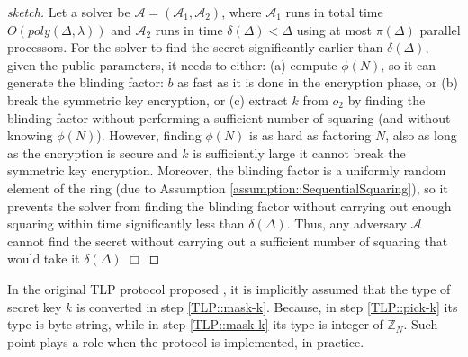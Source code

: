 \begin{proof}[sketch] 
Let  a solver be $\mathcal{A}=(\mathcal{A}_{\scriptscriptstyle 1},\mathcal{A}_{\scriptscriptstyle 2})$, where $\mathcal{A}_{\scriptscriptstyle 1}$ runs in total time $O(poly(\Delta,\lambda))$ and $\mathcal{A}_{\scriptscriptstyle 2}$ runs in  time $\delta(\Delta)<\Delta$ using at most $\pi(\Delta)$ parallel processors. For  the solver to find  the secret significantly earlier than $\delta(\Delta)$, given the public parameters, it needs to either: (a) compute $\phi(N)$, so it can generate the blinding factor: $b$ as fast as it is done in the encryption phase, or (b) break the symmetric key encryption, or (c) extract $k$ from $o_{\scriptscriptstyle 2}$ by finding the blinding factor without performing a sufficient number of  squaring (and without knowing $\phi(N)$). However,  finding  $\phi(N)$ is as hard as factoring $N$, also as long as the encryption is secure and $k$ is sufficiently large  it cannot break the symmetric key encryption. Moreover,  the blinding factor is a uniformly random element of the ring (due to Assumption \ref{assumption::SequentialSquaring}), so it prevents the solver from finding the blinding factor without carrying out enough squaring within time significantly less than $\delta(\Delta)$. Thus, any  adversary $\mathcal{A}$ cannot find the secret without carrying out a sufficient number of squaring that would take it $\delta(\Delta)$ \hfill\(\Box\)
\end{proof}


\begin{remark}

In the original TLP protocol proposed \cite{Rivest:1996:TPT:888615}, it is implicitly assumed that the type of secret key $k$ is converted in step \ref{TLP::mask-k}. Because, in step \ref{TLP::pick-k} its type is byte string, while in step \ref{TLP::mask-k} its type is  integer of $\mathbb{Z}_{\scriptscriptstyle N}$. Such point plays a role when the protocol is implemented, in practice.


\end{remark}


